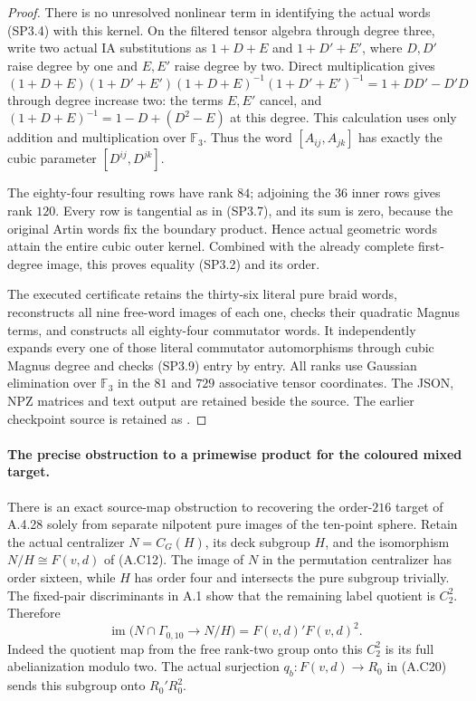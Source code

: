 \begin{proof}
There is no unresolved nonlinear term in identifying the
actual words (SP3.4) with this kernel.  On the filtered tensor
algebra through degree three, write two actual IA substitutions
as $1+D+E$ and $1+D'+E'$, where $D,D'$ raise degree by one
and $E,E'$ raise degree by two.  Direct multiplication gives
\[
 (1+D+E)(1+D'+E')(1+D+E)^{-1}(1+D'+E')^{-1}
        =1+DD'-D'D                                      \tag{SP3.9}
\]
through degree increase two: the terms $E,E'$ cancel, and
$(1+D+E)^{-1}=1-D+(D^2-E)$ at this degree.  This calculation
uses only addition and multiplication over $\mathbb F_3$.
Thus the word $[A_{ij},A_{jk}]$ has exactly the cubic
parameter $[D^{ij},D^{jk}]$.

The eighty-four resulting rows have rank $84$; adjoining the
$36$ inner rows gives rank $120$.  Every row is tangential
as in (SP3.7), and its sum is zero, because the original Artin
words fix the boundary product.  Hence actual geometric words
attain the entire cubic outer kernel.  Combined with the
already complete first-degree image, this proves equality
(SP3.2) and its order.

The executed certificate
retains the thirty-six literal pure braid words, reconstructs all
nine free-word images of each one, checks their quadratic
Magnus terms, and constructs all eighty-four commutator words.
It independently expands every one of those literal
commutator automorphisms through cubic Magnus degree and
checks (SP3.9) entry by entry.  All ranks use Gaussian
elimination over $\mathbb F_3$ in the $81$ and $729$
associative tensor coordinates.  The JSON, NPZ matrices and
text output are retained beside the source.  The earlier
checkpoint source is retained as
.
\end{proof}

\paragraph{The precise obstruction to a primewise product for the coloured mixed target.}
There is an exact source-map obstruction to recovering the
order-$216$ target of A.4.28 solely from separate nilpotent
pure images of the ten-point sphere.  Retain the actual
centralizer $N=C_G(H)$, its deck subgroup $H$, and the
isomorphism $N/H\cong F(v,d)$ of (A.C12).
The image of $N$ in the permutation centralizer has order
sixteen, while $H$ has order four and intersects the pure
subgroup trivially.  The fixed-pair discriminants in A.1 show
that the remaining label quotient is $C_2^2$.  Therefore
\[
 \operatorname{im}\bigl(N\cap\Gamma_{0,10}\to N/H\bigr)
                  =F(v,d)'F(v,d)^2.                    \tag{SP3.10}
\]
Indeed the quotient map from the free rank-two group onto
this $C_2^2$ is its full abelianization modulo two.
The actual surjection $q_b:F(v,d)\to R_0$ in (A.C20) sends
this subgroup onto $R_0'R_0^2$.

